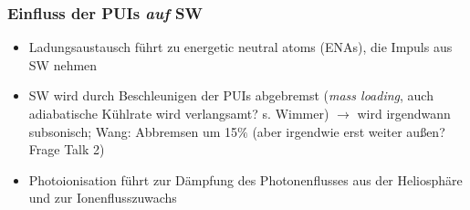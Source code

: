 \documentclass[]{article}
\begin{document}
\subsubsection{Einfluss der PUIs \textit{auf} SW}
\begin{itemize}
	\item Ladungsaustausch führt zu energetic neutral atoms (ENAs), die Impuls aus SW nehmen
	\item SW wird durch Beschleunigen der PUIs abgebremst (\textit{mass loading}, auch adiabatische Kühlrate wird verlangsamt? s. Wimmer) $\rightarrow$ wird irgendwann subsonisch; Wang: Abbremsen um 15$\%$ (aber irgendwie erst weiter außen? Frage Talk 2)
	\item Photoionisation führt zur Dämpfung des Photonenflusses aus der Heliosphäre und zur Ionenflusszuwachs
\end{itemize}
\end{document}
